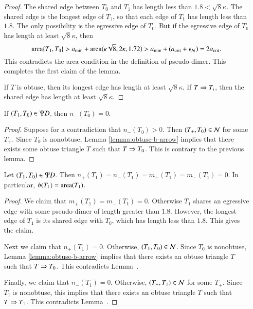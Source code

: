 \begin{proof} 
  The shared edge between $T_0$ and $T_1$ has length less than $1.8 <
  \sqrt8\kappa$.  The shared edge is the longest edge of $T_1$, so
  that each edge of $T_1$ has length less than $1.8$.  The only
  possibility is the egressive edge of $T_0$.  But if the egressive
  edge of $T_0$ has length at least $\sqrt8\kappa$, then
\[
{\operatorname{area}}\{T_1,T_0\} > a_\text{min} + {\operatorname{area}}(\kappa\sqrt8,2\kappa,1.72) 
> a_\text{min} + (a_\text{crit} + \epsilon_{\mathcal N}) = 2a_\text{crit}.
\]
This contradicts the area condition in the definition of pseudo-dimer.
This completes the first claim of the lemma.

If $T$ is obtuse, then its longest edge has length at least
$\sqrt8\kappa$.  If $T\Rightarrow T_i$, then the shared edge has length at
least $\sqrt8\kappa$.
\end{proof}

\begin{corollary}
If $(T_1,T_0)\in\Psi D$, then $n_-(T_0)=0$.
\end{corollary}

\begin{proof} 
  Suppose for a contradiction that $n_-(T_0)>0$.  Then $(T_+,T_0)\in
  \mathcal N$ for some $T_+$.  Since $T_0$ is nonobtuse, Lemma
  \ref{lemma:obtuse-b-arrow} implies that there exists some obtuse
  triangle $T$ such that $T\Rightarrow T_0$.  This is contrary to the previous
  lemma.
\end{proof}

\begin{lemma} 
  Let $(T_1,T_0)\in\Psi D$.  Then
  $n_+(T_1)=n_-(T_1)=m_+(T_1)=m_-(T_1)=0$.  In particular, $b(T_1) =
  {\operatorname{area}}(T_1)$.
\end{lemma}

\begin{proof}  
  We claim that $m_+(T_1)=m_-(T_1)=0$.  Otherwise $T_1$ shares an
  egressive edge with some pseudo-dimer of length greater than $1.8$.
  However, the longest edge of $T_1$ is its shared edge with $T_0$,
  which has length less than $1.8$.  This gives the claim.

  Next we claim that $n_+(T_1)=0$.  Otherwise, $(T_1,T_0)\in \mathcal N$.
  Since $T_0$ is nonobtuse, Lemma \ref{lemma:obtuse-b-arrow} 
  implies that there exists an obtuse
  triangle $T$ such that $T\Rightarrow T_0$.  This contradicts
  Lemma~.

  Finally, we claim that $n_-(T_1)=0$.  Otherwise, $(T_+,T_1)\in \mathcal N$ for
  some $T_+$.  Since $T_1$ is nonobtuse, this implies that there exists
  an obtuse triangle $T$ such that $T\Rightarrow T_1$.  This contradicts
  Lemma~.
\end{proof}

